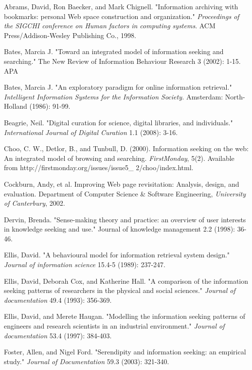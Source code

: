 \documentclass{casconpaper}
\begin{document}
{{} %

{\begin{thebibliography}{9}
Abrams, David, Ron Baecker, and Mark Chignell. "Information archiving with bookmarks: personal Web space construction and organization." \emph{Proceedings of the SIGCHI conference on Human factors in computing systems}. ACM Press/Addison-Wesley Publishing Co., 1998.

Bates, Marcia J. "Toward an integrated model of information seeking and searching." The New Review of Information Behaviour Research 3 (2002): 1-15.
APA	

Bates, Marcia J. "An exploratory paradigm for online information retrieval." \emph{Intelligent Information Systems for the Information Society.} Amsterdam: North-Holland (1986): 91-99.

Beagrie, Neil. "Digital curation for science, digital libraries, and individuals." \emph{International Journal of Digital Curation} 1.1 (2008): 3-16.

Choo, C. W., Detlor, B., and Tunbull, D. (2000). Information seeking on the web: An integrated model of browsing and searching.  \emph{FirstMonday}, 5(2). Available from http://firstmonday.org/issues/issue5\_
2/choo/index.html.

Cockburn, Andy, et al. Improving Web page revisitation: Analysis, design, and evaluation. Department of Computer Science \& Software Engineering, \emph{University of Canterbury}, 2002.

Dervin, Brenda. "Sense-making theory and practice: an overview of user interests in knowledge seeking and use." Journal of knowledge management 2.2 (1998): 36-46.

Ellis, David. "A behavioural model for information retrieval system design." \emph{Journal of information science} 15.4-5 (1989): 237-247.

Ellis, David, Deborah Cox, and Katherine Hall. "A comparison of the information seeking patterns of researchers in the physical and social sciences." \emph{Journal of documentation} 49.4 (1993): 356-369.

Ellis, David, and Merete Haugan. "Modelling the information seeking patterns of engineers and research scientists in an industrial environment." \emph{Journal of documentation} 53.4 (1997): 384-403.

Foster, Allen, and Nigel Ford. "Serendipity and information seeking: an empirical study." \emph{Journal of Documentation} 59.3 (2003): 321-340.


\end{thebibliography}}}
\end{document}
